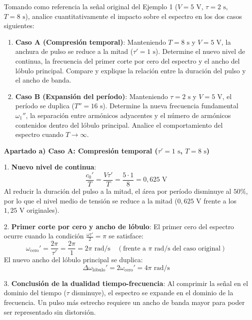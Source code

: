 \begin{problema}
Tomando como referencia la señal original del Ejemplo 1 ($V = 5\text{ V}$, $\tau = 2\text{ s}$, $T = 8\text{ s}$), analice cuantitativamente el impacto sobre el espectro en los dos casos siguientes:

\begin{enumerate}[label=\alph*)]
    \item \textbf{Caso A (Compresión temporal)}: Manteniendo $T = 8\text{ s}$ y $V = 5\text{ V}$, la anchura de pulso se reduce a la mitad ($\tau' = 1\text{ s}$). Determine el nuevo nivel de continua, la frecuencia del primer corte por cero del espectro y el ancho del lóbulo principal. Compare y explique la relación entre la duración del pulso y el ancho de banda.
    \item \textbf{Caso B (Expansión del período)}: Manteniendo $\tau = 2\text{ s}$ y $V = 5\text{ V}$, el período se duplica ($T'' = 16\text{ s}$). Determine la nueva frecuencia fundamental $\omega_1''$, la separación entre armónicos adyacentes y el número de armónicos contenidos dentro del lóbulo principal. Analice el comportamiento del espectro cuando $T \to \infty$.
\end{enumerate}

\tcblower

\textbf{Apartado a) Caso A: Compresión temporal ($\tau' = 1\text{ s}$, $T = 8\text{ s}$)}

1. \textbf{Nuevo nivel de continua}:
   \[
   \frac{c_0'}{T} = \frac{V \tau'}{T} = \frac{5 \cdot 1}{8} = 0{,}625\text{ V}
   \]
   Al reducir la duración del pulso a la mitad, el área por período disminuye al $50\%$, por lo que el nivel medio de tensión se reduce a la mitad ($0{,}625\text{ V}$ frente a los $1{,}25\text{ V}$ originales).

2. \textbf{Primer corte por cero y ancho de lóbulo}:
   El primer cero del espectro ocurre cuando la condición $\frac{\omega \tau'}{2} = \pi$ se satisface:
   \[
   \omega_{\text{cero}}' = \frac{2\pi}{\tau'} = \frac{2\pi}{1} = 2\pi\text{ rad/s} \quad \left(\text{frente a } \pi\text{ rad/s del caso original}\right)
   \]
   El nuevo ancho del lóbulo principal se duplica:
   \[
   \Delta \omega_{\text{lóbulo}}' = 2 \omega_{\text{cero}}' = 4\pi\text{ rad/s}
   \]

3. \textbf{Conclusión de la dualidad tiempo-frecuencia}:
   Al comprimir la señal en el dominio del tiempo ($\tau$ disminuye), el espectro se expande en el dominio de la frecuencia. Un pulso más estrecho requiere un ancho de banda mayor para poder ser representado sin distorsión.


\end{problema}
